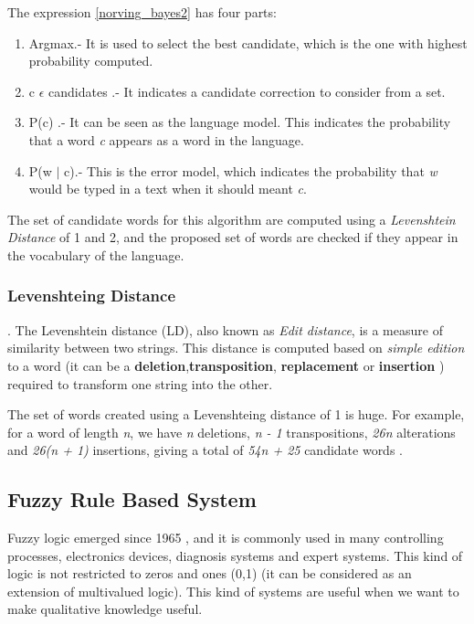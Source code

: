 The expression \ref{norving_bayes2} has four parts:
\begin{enumerate}  
\item Argmax.- It is used to select the best candidate, which is the one with highest probability computed. 
\item c $\epsilon$ candidates .- It indicates a candidate correction to consider from a set.
\item P(c) .- It can be seen as the language model. This indicates the probability that a word \textit{c} appears as a word in the language. 
\item P(w $\mid$ c).- This is the error model, which indicates the probability that \textit{w} would be typed in a text when it should meant \textit{c}. 
\end{enumerate}

The set of candidate words for this algorithm are computed using a \textit{Levenshtein Distance} of 1 and 2, and the proposed set of words are checked if they appear in the vocabulary of the language. 

\subsubsection{Levenshteing Distance}.
The Levenshtein distance (LD), also known as \textit{Edit distance}, is a measure of similarity between two strings. This distance is computed based on \textit{simple edition} to a word (it can be a \textbf{deletion},\textbf{transposition}, \textbf{replacement} or \textbf{insertion} ) required to transform one string into the other.

The set of words created using a Levenshteing distance of 1 is huge. For example, for a word of length \textit{n}, we have \textit{n} deletions, \textit{n - 1} transpositions, \textit{26n} alterations and \textit{26(n + 1) } insertions, giving a total of \textit{54n + 25} candidate words \cite{NorvingSpelling}. 
 

%

%
\subsection{Fuzzy Rule Based System}
%
Fuzzy logic emerged since 1965 \cite{Zadeh1965fuzzy}, and it is commonly used in many controlling processes, electronics devices, diagnosis systems and expert systems. This kind of logic is not restricted to zeros and ones (0,1) (it can be considered as an extension of multivalued logic). This kind of systems are useful when we want to make qualitative knowledge useful.

